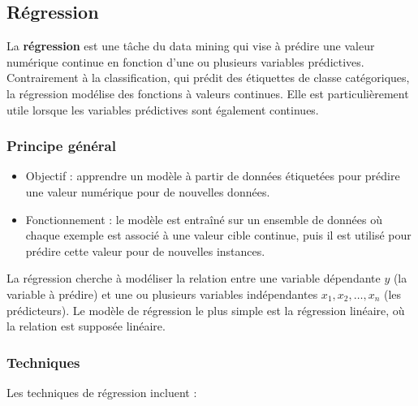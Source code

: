 \documentclass[a4paper,12pt]{report}
\begin{document}
      \subsection{Régression}

La \textbf{régression} est une tâche du data mining qui vise à prédire une valeur numérique continue en fonction d'une ou plusieurs variables prédictives. Contrairement à la classification, qui prédit des étiquettes de classe catégoriques, la régression modélise des fonctions à valeurs continues. Elle est particulièrement utile lorsque les variables prédictives sont également continues.

\subsubsection*{Principe général}

\begin{itemize}
    \item  Objectif : apprendre un modèle à partir de données étiquetées pour prédire une valeur numérique pour de nouvelles données.
    \item  Fonctionnement : le modèle est entraîné sur un ensemble de données où chaque exemple est associé à une valeur cible continue, puis il est utilisé pour prédire cette valeur pour de nouvelles instances.
\end{itemize}

La régression cherche à modéliser la relation entre une variable dépendante \( y \) (la variable à prédire) et une ou plusieurs variables indépendantes \( x_1, x_2, \dots, x_n \) (les prédicteurs). Le modèle de régression le plus simple est la régression linéaire, où la relation est supposée linéaire.

\subsubsection*{Techniques}

Les techniques de régression incluent :
\end{document}
